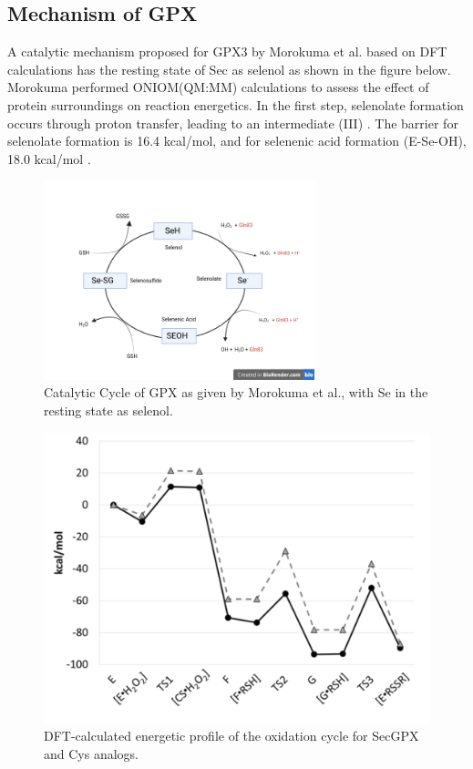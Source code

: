 \documentclass[journal=jacsat,manuscript=article]{achemso}
\begin{document}
\subsection{Mechanism of GPX}

A catalytic mechanism proposed for GPX3 by Morokuma et al. based on DFT calculations has the resting state of Sec as selenol as shown in the figure below. Morokuma \cite{Prabhakar2006} performed ONIOM(QM:MM) calculations to assess the effect of protein surroundings on reaction energetics. In the first step, selenolate formation occurs through proton transfer, leading to an intermediate (III) \cite{Prabhakar2006}. The barrier for selenolate formation is 16.4 kcal/mol, and for selenenic acid formation (E-Se-OH), 18.0 kcal/mol \cite{Prabhakar2006}.

\begin{figure}[h]
\includegraphics[width=0.7\textwidth, inner]{figures/Catalytic_cycle.png}
\caption{Catalytic Cycle of GPX as given by Morokuma et al., with Se in the resting state as selenol.}
\label{fig:figure1}
\end{figure}

\begin{figure}
\includegraphics[width=0.7\linewidth]{figures/flohe_energyprofile.png} 
\caption{DFT-calculated energetic profile of the oxidation cycle for SecGPX and Cys analogs.}
\label{fig:figure2}
\end{figure}
\end{document}

